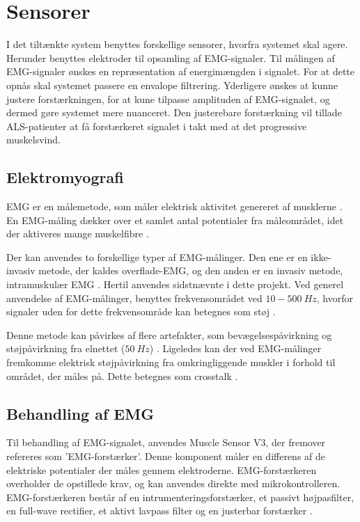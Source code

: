 \section{Sensorer} \label{sec:sensorer}
I det tiltænkte system benyttes forskellige sensorer, hvorfra systemet skal agere. Herunder benyttes elektroder til opsamling af EMG-signaler. Til målingen af EMG-signaler ønskes en repræsentation af energimængden i signalet. For at dette opnås skal systemet passere en envalope filtrering. Yderligere ønskes at kunne justere forstærkningen, for at kune tilpasse amplituden af EMG-signalet, og dermed gøre systemet mere nuanceret. Den justerebare forstærkning vil tillade ALS-patienter at få forstærkeret signalet i takt med at det progressive muskelsvind. 

\subsection{Elektromyografi}
EMG er en målemetode, som måler elektrisk aktivitet genereret af musklerne \citep{chowdhury2013}. 
En EMG-måling dækker over et samlet antal potentialer fra måleområdet, idet der aktiveres mange muskelfibre \citep{keenan2012}. 

Der kan anvendes to forskellige typer af EMG-målinger. Den ene er en ikke-invasiv metode, der kaldes overflade-EMG, og den anden er en invasiv metode, intramuskulær EMG \citep{chowdhury2013, keenan2012}. Hertil anvendes sidstnævnte i dette projekt. 
Ved generel anvendelse af EMG-målinger, benyttes frekvensområdet ved $10-500~Hz$, hvorfor signaler uden for dette frekvensområde kan betegnes som støj \citep{morre2003, keenan2012}.  

Denne metode kan påvirkes af flere artefakter, som bevægelsespåvirkning og støjpåvirkning fra elnettet ($50~Hz$) \citep{keenan2012}.
Ligeledes kan der ved EMG-målinger fremkomme elektrisk støjpåvirkning fra omkringliggende muskler i forhold til området, der måles på. Dette betegnes som crosstalk \citep{keenan2012}. 

\subsection{Behandling af EMG}
Til behandling af EMG-signalet, anvendes Muscle Sensor V3, der fremover refereres som 'EMG-forstærker'. Denne komponent måler en differens af de elektriske potentialer der måles gennem elektroderne. EMG-forstærkeren overholder de opstillede krav, og kan anvendes direkte med mikrokontrolleren. EMG-forstærkeren består af en intrumenteringsforstærker, et passivt højpasfilter, en full-wave rectifier, et aktivt lavpass filter og en justerbar forstærker \citep{advancertech2013}. 

